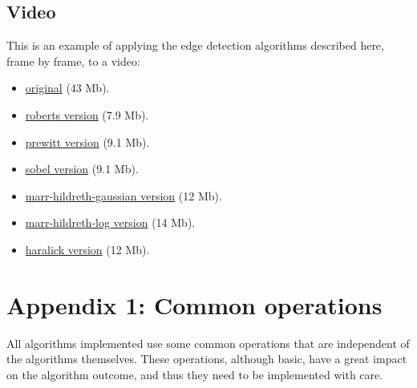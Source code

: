 \documentclass{ipol}
\numberwithin{equation}{section}
\numberwithin{table}{section}
\numberwithin{figure}{section}
\begin{document}
\subsection{Video}

This is an example of applying the edge detection algorithms described here, frame by frame, to a video: 
\begin{itemize}
	\centering
	\item \href{http://iie.fing.edu.uy/~haldos/ipol/video.mov}{original} (43 Mb).
\end{itemize}
\begin{multicols}{2}
\begin{itemize}
	\item \href{http://iie.fing.edu.uy/~haldos/ipol/video-roberts-wide_0.1.mov}{roberts version} (7.9 Mb).
	\item \href{http://iie.fing.edu.uy/~haldos/ipol/video-prewitt-wide_0.1.mov}{prewitt version} (9.1 Mb).
	\item \href{http://iie.fing.edu.uy/~haldos/ipol/video-sobel-wide_0.1.mov}{sobel version} (9.1 Mb).
	\item \href{http://iie.fing.edu.uy/~haldos/ipol/video-marr-hildreth-gaussian-wide_3_19_0.04.mov}{marr-hildreth-gaussian version} (12 Mb).
	\item \href{http://iie.fing.edu.uy/~haldos/ipol/video-marr-hildreth-log-wide_3_25_0.04.mov}{marr-hildreth-log version} (14 Mb).
	\item \href{http://iie.fing.edu.uy/~haldos/ipol/video-haralick-wide_0.5.mov}{haralick version} (12 Mb).
\end{itemize}
\end{multicols}




\clearpage
\section{Appendix 1: Common operations}
\label{sec:appendix1}

All algorithms implemented use some common operations that are independent of the algorithms themselves. 
These operations, although basic, have a great impact on the algorithm outcome, and thus they need to be 
implemented with care.\\
\end{document}
